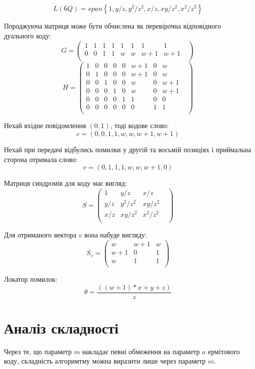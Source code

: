 \documentclass[a4paper,12pt,oneside]{article}
\begin{document}
$$L(6Q) = span \left \{ 1, y/z, y^2/z^2, x/z, xy/z^2, x^2/z^2 \right \}$$

Породжуюча матриця може бути обчислена як перевірочна відповідного дуального коду:
$$
G = 
\begin{pmatrix}
    1 &  1 &  1 &  1 &  1 &  1 &  1 &  1 &  \\
    0 &  0 &  1 &  1 &  w &  w &  w + 1 &  w + 1 &  \\
\end{pmatrix}
$$
$$
H = 
\begin{pmatrix}
    1 &  0 &  0 &  0 &  0 &  w + 1 &  0 &  w &  \\
    0 &  1 &  0 &  0 &  0 &  w + 1 &  0 &  w &  \\
    0 &  0 &  1 &  0 &  0 &  w &  0 &  w + 1 &  \\
    0 &  0 &  0 &  1 &  0 &  w &  0 &  w + 1 &  \\
    0 &  0 &  0 &  0 &  1 &  1 &  0 &  0 &  \\
    0 &  0 &  0 &  0 &  0 &  0 &  1 &  1 &  \\
\end{pmatrix}
$$

Нехай вхідне повідомлення $(0,1)$, тоді кодове слово:
$$c=(0, 0, 1, 1, w, w, w + 1, w + 1)$$

Нехай при передачі відбулись помилки у другій та восьмій позиціях і приймальна сторона отримала слово:
$$v=(0, 1, 1, 1, w, w, w + 1, 0)$$

Матриця синдромів для коду має вигляд:
$$
S =
\begin{pmatrix}
    1 &  y/z &  x/z &  \\
    y/z &  y^2/z^2 &  xy/z^2 &  \\
    x/z &  xy/z^2 &  x^2/z^2 &  \\
\end{pmatrix}
$$

Для отриманого вектора $v$ вона набуде вигляду:
$$
S_v =
\begin{pmatrix}
    w & w +1 & w \\
    w + 1 & 0 & 1 \\
    w & 1 & 1 \\
\end{pmatrix}
$$

Локатор помилок:
$$
\theta = \frac{(( w + 1)*x + y + z)}{z}
$$

\section{Аналіз складності}
Через те, що параметр $m$ накладає певні обмеження на параметр $a$ ермітового коду, складність алгоримтму 
можна виразити лише через параметр $m$.
\end{document}
